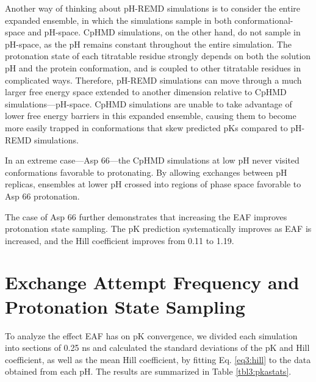 Another way of thinking about pH-REMD simulations is to consider the entire
expanded ensemble, in which the simulations sample in both conformational-space
and pH-space.  CpHMD simulations, on the other hand, do not sample in pH-space,
as the pH remains constant throughout the entire simulation.  The protonation
state of each titratable residue strongly depends on both the solution pH and
the protein conformation, and is coupled to other titratable residues in
complicated ways.  Therefore, pH-REMD simulations can move through a much larger
free energy space extended to another dimension relative to CpHMD
simulations---pH-space.  CpHMD simulations are unable to take advantage of lower
free energy barriers in this expanded ensemble, causing them to become more
easily trapped in conformations that skew predicted pKs compared to
pH-REMD simulations.

In an extreme case---Asp 66---the CpHMD simulations at low pH never visited
conformations favorable to protonating.  By allowing exchanges between pH
replicas, ensembles at lower pH crossed into regions of phase space favorable to
Asp 66 protonation.

The case of Asp 66 further demonstrates that increasing the EAF improves
protonation state sampling.  The pK prediction systematically improves as
EAF is increased, and the Hill coefficient improves from 0.11 to 1.19.

\section{Exchange Attempt Frequency and Protonation State Sampling}

To analyze the effect EAF has on pK convergence, we divided each
simulation into sections of 0.25 ns and calculated the standard deviations of
the pK and Hill coefficient, as well as the mean Hill coefficient, by
fitting Eq. \ref{eq3:hill} to the data obtained from each pH.  The results are
summarized in Table \ref{tbl3:pkastats}.

